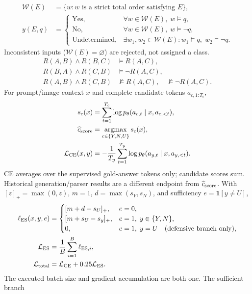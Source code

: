 \begin{align}
\mathcal W(E)&=\{w:w\text{ is a strict total order satisfying }E\},\\
y(E,q)&=\begin{cases}
\mathrm{Yes},&\forall w\in\mathcal W(E),\;w\models q,\\
\mathrm{No},&\forall w\in\mathcal W(E),\;w\models\neg q,\\
\mathrm{Undetermined},&\exists w_1,w_2\in\mathcal W(E):w_1\models q,\;w_2\models\neg q.
\end{cases}
\end{align}
Inconsistent inputs ($\mathcal W(E)=\varnothing$) are rejected, not assigned a class.
\begin{align}
R(A,B)\land R(B,C)&\models R(A,C),\\
R(B,A)\land R(C,B)&\models\neg R(A,C),\\
R(A,B)\land R(C,B)&\not\models R(A,C),\quad\not\models\neg R(A,C).
\end{align}
For prompt/image context $x$ and complete candidate tokens $a_{c,1:T_c}$,
\begin{align}
s_c(x)&=\sum_{t=1}^{T_c}\log p_\theta(a_{c,t}\mid x,a_{c,<t}),\\
\widehat c_{\rm score}&=\mathop{\rm argmax}_{c\in\{Y,N,U\}}s_c(x),\\
\mathcal L_{\rm CE}(x,y)&=-\frac1{T_y}\sum_{t=1}^{T_y}\log p_\theta(a_{y,t}\mid x,a_{y,<t}).
\end{align}
CE averages over the supervised gold-answer tokens only; candidate scores sum.
Historical generation/parser results are a different endpoint from $\widehat c_{\rm score}$.
With $[z]_+=\max(0,z)$, $m=1$, $d=\max(s_Y,s_N)$, and sufficiency $e=\mathbf1[y\ne U]$,
\begin{align}
\ell_{\rm ES}(x,y,e)&=\begin{cases}
[m+d-s_U]_+,&e=0,\\
[m+s_U-s_y]_+,&e=1,\;y\in\{Y,N\},\\
0,&e=1,\;y=U\quad\text{(defensive branch only)},
\end{cases}\\
\mathcal L_{\rm ES}&=\frac1B\sum_{i=1}^B\ell_{{\rm ES},i},\\
\mathcal L_{\rm total}&=\mathcal L_{\rm CE}+0.25\mathcal L_{\rm ES}.
\end{align}
The executed batch size and gradient accumulation are both one. The sufficient branch
